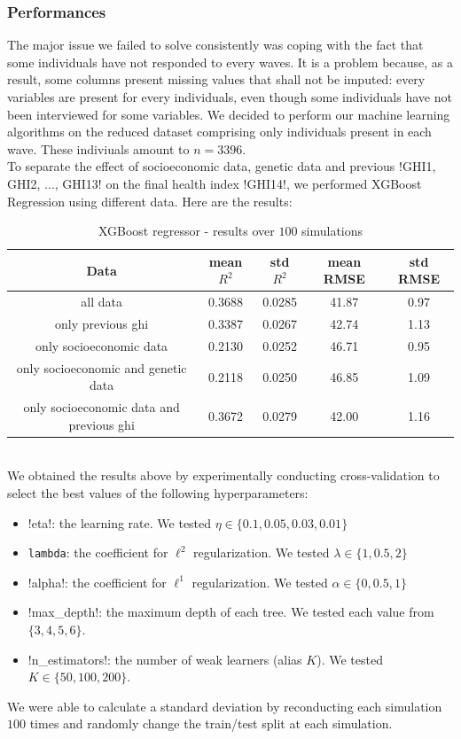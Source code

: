 \documentclass[]{article}
\begin{document}
\subsubsection{Performances}
The major issue we failed to solve consistently was coping with the fact that some individuals have not responded to every waves. It is a problem because, as a result, some columns present missing values that shall not be imputed: every variables are present for every individuals, even though some individuals have not been interviewed for some variables. We decided to perform our machine learning algorithms on the reduced dataset comprising only individuals present in each wave. These indiviuals amount to $n = 3396$.\\

\noindent
To separate the effect of socioeconomic data, genetic data and previous \pyth!GHI1, GHI2, ..., GHI13! on the final health index \pyth!GHI14!, we performed XGBoost Regression using different data. Here are the results:
\begin{table}[!h]
\centering
\begin{tabular}{|c|c|c|c|c|}
	\hline
	\textbf{Data} & \textbf{mean $R^2$} & \textbf{std $R^2$} & \textbf{mean RMSE} & \textbf{std RMSE}\\
	\hline
	all data & 0.3688 & 0.0285 & 41.87 & 0.97 \\ 
	\hline
	only previous ghi & 0.3387 & 0.0267 & 42.74 & 1.13\\
	\hline 
	only socioeconomic data & 0.2130 &0.0252 & 46.71 & 0.95\\
	\hline 
	only socioeconomic and genetic data & 0.2118 & 0.0250 & 46.85 & 1.09\\
	\hline 
	only socioeconomic data and previous ghi & 0.3672 &	0.0279 & 42.00 & 1.16\\
	\hline 
\end{tabular}
\label{results_xgbregressor}
\caption{XGBoost regressor - results over $100$ simulations}
\end{table}\\
We obtained the results above by experimentally conducting cross-validation to select the best values of the following hyperparameters:
\begin{itemize}
	\item \pyth!eta!: the learning rate. We tested $\eta \in \{0.1, 0.05, 0.03, 0.01\}$
	\item \texttt{lambda}: the coefficient for $\ell^2$ regularization. We tested $\lambda \in \{1, 0.5, 2\}$
	\item \pyth!alpha!: the coefficient for $\ell^1$ regularization. We tested $\alpha \in \{0, 0.5, 1\}$
	\item \pyth!max_depth!: the maximum depth of each tree. We tested each value from $\{3, 4, 5, 6\}$.
	\item \pyth!n_estimators!: the number of weak learners (alias $K$). We tested $K\in \{50, 100, 200\}$.
\end{itemize}
We were able to calculate a standard deviation by reconducting each simulation $100$ times and randomly change the train/test split at each simulation.\\
\end{document}
